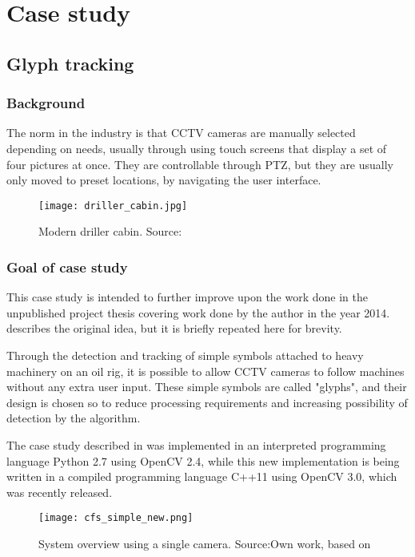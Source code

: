 \chapter{Case study}
\section{Glyph tracking}
\subsection{Background}

The norm in the industry is that CCTV cameras are manually selected depending on needs, usually through using touch screens that display a set of four pictures at once. They are controllable through PTZ, but they are usually only moved to preset locations, by navigating the user interface.

\begin{figure}[ht]
    \centering
    \texttt{[image: driller\_cabin.jpg]}
    \caption{Modern driller cabin. Source:\cite{}}
    \label{fig:driller_cabin}
\end{figure}
\FloatBarrier

\subsection{Goal of case study}
This case study is intended to further improve upon the work done in the unpublished project thesis covering work done by the author in the year 2014. \citet{joakimsk14} describes the original idea, but it is briefly repeated here for brevity.

Through the detection and tracking of simple symbols attached to heavy machinery on an oil rig, it is possible to allow CCTV cameras to follow machines without any extra user input. These simple symbols are called "glyphs", and their design is chosen so to reduce processing requirements and increasing possibility of detection by the algorithm.

The case study described in \citet{joakimsk14} was implemented in an interpreted programming language Python 2.7 using OpenCV 2.4, while this new implementation is being written in a compiled programming language C++11 using OpenCV 3.0, which was recently released.

\begin{figure}[ht]
    \centering
    \texttt{[image: cfs\_simple\_new.png]}
    \caption{System overview using a single camera. Source:Own work, based on \citet{joakimsk14}}
    \label{fig:cfs_simple_new}
\end{figure}
\FloatBarrier

